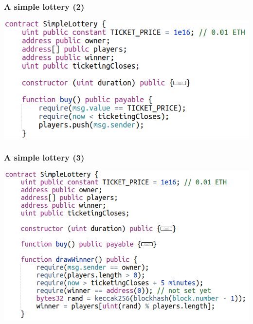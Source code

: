 \documentclass[11pt]{beamer}  %
\begin{document}
\begin{frame}\frametitle{A simple lottery (2)}

  \begin{center}
    \includegraphics[scale=0.4,clip=false]{pictures/simple-lottery-2.png}
  \end{center}

\end{frame}

\begin{frame}\frametitle{A simple lottery (3)}

  \begin{center}
    \includegraphics[scale=0.4,clip=false]{pictures/simple-lottery-3.png}
  \end{center}

\end{frame}
\end{document}
